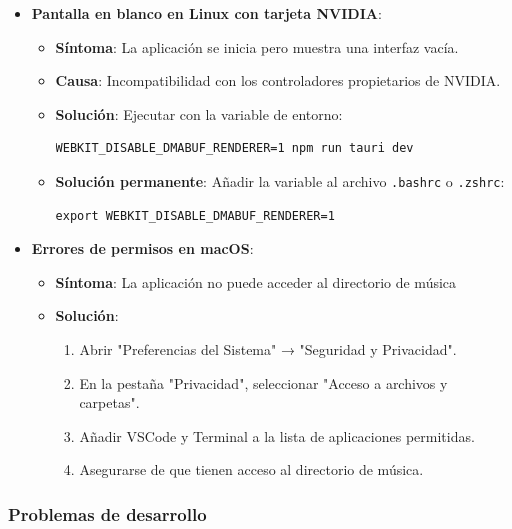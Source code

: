 \documentclass[11pt, a4paper]{article}
\begin{document}
    \begin{itemize}
        \item \textbf{Pantalla en blanco en Linux con tarjeta NVIDIA}:
        \begin{itemize}
          \item \textbf{Síntoma}: La aplicación se inicia pero muestra una interfaz vacía.
          \item \textbf{Causa}: Incompatibilidad con los controladores propietarios de NVIDIA.
          \item \textbf{Solución}: Ejecutar con la variable de entorno:
            \begin{lstlisting}[caption={Solución Linux}]
WEBKIT_DISABLE_DMABUF_RENDERER=1 npm run tauri dev
            \end{lstlisting}
          \item \textbf{Solución permanente}: Añadir la variable al archivo \texttt{.bashrc} o \texttt{.zshrc}:
            \begin{lstlisting}
export WEBKIT_DISABLE_DMABUF_RENDERER=1
            \end{lstlisting}
        \end{itemize}
        
        \item \textbf{Errores de permisos en macOS}:
        \begin{itemize}
          \item \textbf{Síntoma}: La aplicación no puede acceder al directorio de música
          \item \textbf{Solución}:
            \begin{enumerate}
              \item Abrir "Preferencias del Sistema" → "Seguridad y Privacidad".
              \item En la pestaña "Privacidad", seleccionar "Acceso a archivos y carpetas".
              \item Añadir VSCode y Terminal a la lista de aplicaciones permitidas.
              \item Asegurarse de que tienen acceso al directorio de música.
            \end{enumerate}
        \end{itemize}
    \end{itemize}

    \subsubsection{Problemas de desarrollo}
\end{document}
